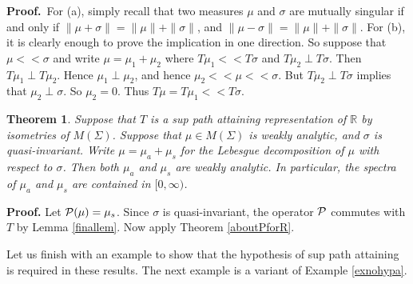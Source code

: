 \documentclass[12pt]{article}
\newcommand{\R}{\mathbb R}
\newcommand{\cP}{{\cal P}}
\newtheorem{thm}[defin]{Theorem}
\begin{document}
\noindent
{\bf Proof.}\ For (a), simply recall that two measures $\mu$ and $\sigma$
are mutually singular if and only if $\|\mu+\sigma\|=\|\mu\|+\|\sigma\|$, and 
$\|\mu-\sigma\|=\|\mu\|+\|\sigma\|$.
For (b), it is clearly enough to prove the implication in one direction.
So suppose that 
$\mu<<\sigma$ and write $\mu=\mu_1+\mu_2$ where 
$T\mu_1<<T\sigma$ and 
$T\mu_2\perp T\sigma$.
Then 
$T\mu_1\perp T\mu_2$.  Hence 
$ \mu_1\perp  \mu_2$, and hence $\mu_2<<\mu<<\sigma$.
But $T\mu_2\perp T\sigma$ implies that $\mu_2\perp \sigma$.  So
$\mu_2=0$.  Thus $T\mu=T\mu_1<<T\sigma$.


\begin{thm}
Suppose that $T$ is a sup path attaining representation
of $\R$ by isometries of $M(\Sigma)$.  Suppose 
that $\mu\in M(\Sigma)$ is weakly analytic, and
$\sigma$ is quasi-invariant.  Write
$\mu=\mu_a+\mu_s$ for the Lebesgue decomposition of $\mu$
with respect to $\sigma$.  Then both
$\mu_a$ and $\mu_s$ are weakly analytic.  In particular,
the spectra of $\mu_a$ and $\mu_s$ are
contained in $[0,\infty)$.
\label{lebesgue-decomp-forR}
\end{thm}
{\bf Proof.}  Let $\cP(\mu)=\mu_s$.  
Since $\sigma$ is quasi-invariant, the operator
$\cP$ commutes with $T$ by Lemma \ref{finallem}.  
Now apply Theorem 
\ref{aboutPforR}.


Let us finish with an example to show that the hypothesis of 
sup path attaining is required in these results.  The
next example is a variant of Example \ref{exnohypa}.
\end{document}
